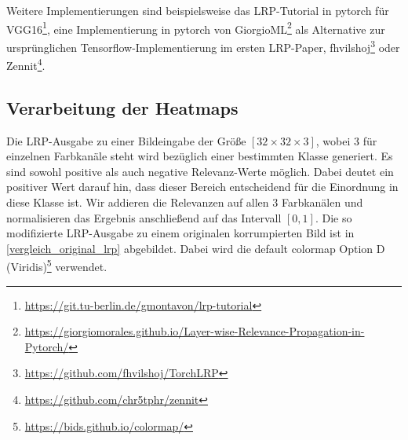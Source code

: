 \documentclass[11pt,a4paper]{article}
\numberwithin{equation}{section}
\begin{document}
	Weitere Implementierungen sind beispielsweise das LRP-Tutorial in pytorch für VGG16\footnote{\url{https://git.tu-berlin.de/gmontavon/lrp-tutorial}}, eine Implementierung in pytorch von GiorgioML\footnote{\url{https://giorgiomorales.github.io/Layer-wise-Relevance-Propagation-in-Pytorch/}} als Alternative zur ursprünglichen Tensorflow-Implementierung im ersten LRP-Paper, fhvilshoj\footnote{\url{https://github.com/fhvilshoj/TorchLRP}} oder Zennit\footnote{\url{https://github.com/chr5tphr/zennit}}.
	
	 



\subsection{Verarbeitung der Heatmaps}

Die LRP-Ausgabe zu einer Bildeingabe der Größe $[32 \times 32 \times 3]$, wobei 3 für einzelnen Farbkanäle steht wird bezüglich einer bestimmten Klasse generiert. Es sind sowohl positive als auch negative Relevanz-Werte möglich. Dabei deutet ein positiver Wert darauf hin, dass dieser Bereich entscheidend für die Einordnung in diese Klasse ist. Wir addieren die Relevanzen auf allen 3 Farbkanälen und normalisieren das Ergebnis anschließend auf das Intervall $[0,1]$. Die so modifizierte LRP-Ausgabe zu einem originalen korrumpierten Bild ist in \autoref{vergleich_original_lrp} abgebildet. Dabei wird die default colormap Option D (Viridis)\footnote{\url{https://bids.github.io/colormap/}} verwendet.
\end{document}
